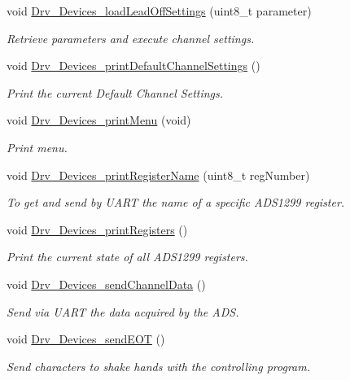 \begin{DoxyCompactItemize}
void \hyperlink{group__Devices__Library_ga91621cb0b85d8918aa835f198c827379}{Drv\+\_\+\+Devices\+\_\+load\+Lead\+Off\+Settings} (uint8\+\_\+t parameter)
\begin{DoxyCompactList}\small\item\em Retrieve parameters and execute channel settings. \end{DoxyCompactList}\item 
void \hyperlink{group__Devices__Library_ga1a1a6145a5269b2a7ebd45abdb53b660}{Drv\+\_\+\+Devices\+\_\+print\+Default\+Channel\+Settings} ()
\begin{DoxyCompactList}\small\item\em Print the current Default Channel Settings. \end{DoxyCompactList}\item 
void \hyperlink{group__Devices__Library_gac177c9b23475b7551fbcebe3db410bf0}{Drv\+\_\+\+Devices\+\_\+print\+Menu} (void)
\begin{DoxyCompactList}\small\item\em Print menu. \end{DoxyCompactList}\item 
void \hyperlink{group__Devices__Library_gad85a26f63a893c55cdbbe5c4c0d0e69e}{Drv\+\_\+\+Devices\+\_\+print\+Register\+Name} (uint8\+\_\+t reg\+Number)
\begin{DoxyCompactList}\small\item\em To get and send by U\+A\+RT the name of a specific A\+D\+S1299 register. \end{DoxyCompactList}\item 
void \hyperlink{group__Devices__Library_gad214f99a7d211af8779b46b244f99d99}{Drv\+\_\+\+Devices\+\_\+print\+Registers} ()
\begin{DoxyCompactList}\small\item\em Print the current state of all A\+D\+S1299 registers. \end{DoxyCompactList}\item 
void \hyperlink{group__Devices__Library_ga828212dc5604557924cd8ea9e6252c6c}{Drv\+\_\+\+Devices\+\_\+send\+Channel\+Data} ()
\begin{DoxyCompactList}\small\item\em Send via U\+A\+RT the data acquired by the A\+DS. \end{DoxyCompactList}\item 
void \hyperlink{group__Devices__Library_ga26ea493ed59bae1e6a0c0af4ece44f40}{Drv\+\_\+\+Devices\+\_\+send\+E\+OT} ()
\begin{DoxyCompactList}\small\item\em Send characters to shake hands with the controlling program. \end{DoxyCompactList}\item 

\end{DoxyCompactItemize}
